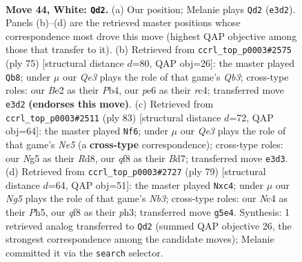 \documentclass[11pt]{article}
\begin{document}
\clearpage

\begin{figure}[p]\centering
\begin{subfigure}{0.46\textwidth}\centering
\resizebox{\linewidth}{!}{%
\newchessgame
\chessboard[
  setfen={rnb2q2/1p4k1/4p3/p2n1pNp/P1N2P2/1P2Q1P1/4B1KP/7R w - - 0 44},
  showmover=false,
  pgfstyle=straightmove, color=movearrow, markmove={e3-d2}
]}
\caption{}
\end{subfigure}\hfill
\begin{subfigure}{0.46\textwidth}\centering
\resizebox{\linewidth}{!}{%
\newchessgame
\chessboard[
  setfen={r7/5pbk/1q2p1p1/3n3p/NpRP3P/1P4P1/1P1B1P2/2Q3K1 b - - 2 38},
  showmover=false,
  pgfstyle=straightmove, color=movearrow, markmove={b6-b8}
]}
\caption{}
\end{subfigure}
\\[4pt]
\begin{subfigure}{0.46\textwidth}\centering
\resizebox{\linewidth}{!}{%
\newchessgame
\chessboard[
  setfen={3r2k1/p2b1pp1/1p1P3p/2p2q2/P1N1n2P/1P4P1/5PB1/3RQ1K1 b - - 28 42},
  showmover=false,
  pgfstyle=straightmove, color=movearrow, markmove={e4-f6}
]}
\caption{}
\end{subfigure}\hfill
\begin{subfigure}{0.46\textwidth}\centering
\resizebox{\linewidth}{!}{%
\newchessgame
\chessboard[
  setfen={3rb3/5pk1/1n1p2p1/p1q1p2p/2P1P3/3N1P1P/P2Q2PK/1R3B2 b - - 5 40},
  showmover=false,
  pgfstyle=straightmove, color=movearrow, markmove={b6-c4}
]}
\caption{}
\end{subfigure}
\caption{\textbf{Move 44, White: \texttt{Qd2}.} (a) Our position; Melanie plays \texttt{Qd2} (\texttt{e3d2}). Panels (b)--(d) are the retrieved master positions whose correspondence most drove this move (highest QAP objective among those that transfer to it). (b) Retrieved from \texttt{ccrl\_top\_p0003\#2575} (ply 75) [structural distance $d$=80, QAP obj=26]: the master played \texttt{Qb8}; under $\mu$ our \emph{Qe3} plays the role of that game's \emph{Qb3}; cross-type roles: our \emph{B}e2 as their \emph{P}b4, our \emph{p}e6 as their \emph{r}c4; transferred move \texttt{e3d2} \textbf{(endorses this move)}. (c) Retrieved from \texttt{ccrl\_top\_p0003\#2511} (ply 83) [structural distance $d$=72, QAP obj=64]: the master played \texttt{Nf6}; under $\mu$ our \emph{Qe3} plays the role of that game's \emph{Ne5} (a \textbf{cross-type} correspondence); cross-type roles: our \emph{N}g5 as their \emph{R}d8, our \emph{q}f8 as their \emph{B}d7; transferred move \texttt{e3d3}. (d) Retrieved from \texttt{ccrl\_top\_p0003\#2727} (ply 79) [structural distance $d$=64, QAP obj=51]: the master played \texttt{Nxc4}; under $\mu$ our \emph{Ng5} plays the role of that game's \emph{Nb3}; cross-type roles: our \emph{N}c4 as their \emph{P}h5, our \emph{q}f8 as their \emph{p}h3; transferred move \texttt{g5e4}. Synthesis: 1 retrieved analog transferred to \texttt{Qd2} (summed QAP objective 26, the strongest correspondence among the candidate moves); Melanie committed it via the \texttt{search} selector.}
\label{fig:thought-m86}
\end{figure}
\end{document}

